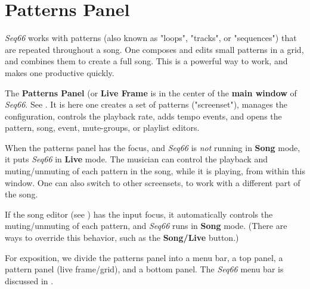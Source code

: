 %
%
%

\section{Patterns Panel}
\label{sec:patterns_panel}

   \textsl{Seq66} works with patterns (also known as "loops", "tracks", or
   "sequences") that are repeated throughout a song.
   One composes and edits small patterns in a grid,
   and combines them to create a full song.
   This is a powerful way to work, and makes one productive quickly.

   The \textbf{Patterns Panel} (or \textbf{Live Frame}
   is in the center of the
   \textbf{main window} of \textsl{Seq66}.
   See .
   It is here one creates a set of patterns ("screenset"),
   manages the configuration, controls the playback rate, adds tempo events,
   and opens the pattern, song, event, mute-groups, or playlist editors.

   When the patterns panel has the focus,
   and \textsl{Seq66} is \textsl{not} running in \textbf{Song} mode,
   it puts \textsl{Seq66} in \textbf{Live} mode.
   The musician can
   control the playback and muting/unmuting of each pattern in
   the song, while it is playing, from within this window.
   One can also switch to other screensets, to work with a different
   part of the song.

   If the song editor (see )
   has the input focus, it automatically controls the muting/unmuting of
   each pattern, and \textsl{Seq66} runs in \textbf{Song} mode.
   (There are ways to override this behavior, such as the
   \textbf{Song/Live} button.)

   For exposition, we divide the patterns panel
   into a menu bar, a top panel, a pattern panel (live frame/grid),
   and a bottom panel.
   The \textsl{Seq66} menu bar is discussed in .

